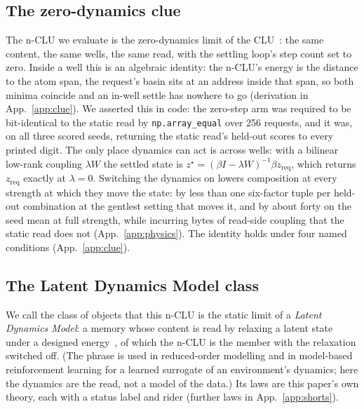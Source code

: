 \documentclass{article} %
\begin{document}
\subsection{The zero-dynamics clue}
\label{sec:clue}

The n-CLU we evaluate is the zero-dynamics limit of the CLU~\citep{jawahar2026chlu}: the same content, the same wells,
the same read, with the settling loop's step count set to zero. Inside a well this is an
algebraic identity: the n-CLU's energy is the distance to the atom span, the request's basin sits
at an address inside that span, so both minima coincide and an in-well settle has nowhere to go
(derivation in App.~\ref{app:clue}). We asserted this in code: the zero-step arm was required to be bit-identical to
the static read by \texttt{np.array\_equal} over 256 requests, and it was, on all three scored
seeds, returning the static read's held-out scores to every printed digit. %
The only place dynamics can act is across wells: with a bilinear low-rank coupling $\lambda W$
the settled state is $z^\star=(\beta I-\lambda W)^{-1}\beta z_{\text{req}}$, which returns
$z_{\text{req}}$ exactly at $\lambda=0$. Switching the dynamics on lowers composition at every
strength at which they move the state: by less than one six-factor tuple per
held-out combination at the gentlest setting that moves it, and by about forty on the seed mean at full strength, while incurring
bytes of read-side coupling that the static read does not (App.~\ref{app:physics}). %
The identity holds under four named conditions (App.~\ref{app:clue}).

\subsection{The Latent Dynamics Model class}
\label{sec:theory}

We call the class of objects that this n-CLU is the static limit of a \emph{Latent Dynamics
Model}: a memory whose content is read by relaxing a latent state under a designed energy~\citep{hopfield_neural_1982,krotov_dense_2016,ramsauer_hopfield_2021,hoover_energy_2023,kong_reservoir-computing_2024}, of
which the n-CLU is the member with the relaxation switched off. (The phrase is used in
reduced-order modelling and in model-based reinforcement learning for a learned surrogate of an
environment's dynamics; here the dynamics are the read, not a model of the data.) Its laws are this paper's own theory, each with a status label and rider (further laws in App.~\ref{app:shorts}).
\end{document}
